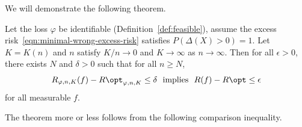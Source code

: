 \documentclass[11pt]{article}
\newcommand{\sloss}{\varphi}  %
\begin{document}
We will demonstrate the following theorem.
\begin{theorem}
  \label{theorem:knn-works}
  Let the loss $\sloss$ be identifiable (Definition~\ref{def:feasible}),
  assume the excess risk~\eqref{eqn:minimal-wrong-excess-risk} satisfies
  $P(\Delta(X) > 0) = 1$.
  Let $K = K(n)$ and $n$ satisfy $K/n \to 0$ and $K \to \infty$ as $n \to
  \infty$.
  Then for all $\epsilon > 0$, there exists $N$ and $\delta > 0$ such that
  for all $n \ge N$,
  \begin{equation*}
    R_{\sloss,n,K}(f) - R\opt_{\sloss,n,K}
    \le \delta
    ~~ \mbox{implies} ~~
    R(f) - R\opt \le \epsilon
  \end{equation*}
  for all measurable $f$.
\end{theorem}


The theorem more or less follows from
the following comparison inequality.

\end{document}
